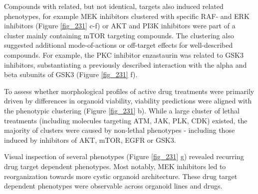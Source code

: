 \begin{flushleft}
Compounds with related, but not identical, targets also induced related phenotypes, for example MEK inhibitors clustered with specific RAF- and ERK inhibitors (Figure \ref{fig_231} c-f) or AKT and PI3K inhibitors were part of a cluster mainly containing mTOR targeting compounds. The clustering also suggested additional mode-of-actions or off-target effects for well-described compounds. For example, the PKC inhibitor enzastaurin was related to GSK3 inhibitors, substantiating a previously described interaction with the alpha and beta subunits of GSK3 \cite{Kotliarova2008-tz, Klaeger2017-vu} (Figure \ref{fig_231} f). 

\bigbreak
To assess whether morphological profiles of active drug treatments were primarily driven by differences in organoid viability, viability predictions were aligned with the phenotypic clustering (Figure \ref{fig_231} b). While a large cluster of lethal treatments (including molecules targeting ATM, JAK, PLK, CDK) existed, the majority of clusters were caused by non-lethal phenotypes - including those induced by inhibitors of AKT, mTOR, EGFR or GSK3.

\bigbreak
Visual inspection of several phenotypes (Figure \ref{fig_231} g) revealed recurring drug target dependent phenotypes. Most notably, MEK inhibitors led to reorganization towards more cystic organoid architecture. These drug target dependent phenotypes were observable across organoid lines and drugs.



\end{flushleft}
